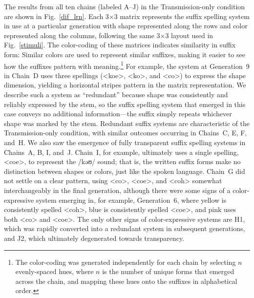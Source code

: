 \documentclass[doc,biblatex]{apa7}
\begin{document}
The results from all ten chains (labeled A--J) in the Transmission-only condition are shown in Fig.~\ref{dif_lrn}. Each 3×3 matrix represents the suffix spelling system in use at a particular generation with shape represented along the rows and color represented along the columns, following the same 3×3 layout used in Fig.~\ref{stimuli}. The color-coding of these matrices indicates similarity in suffix form: Similar colors are used to represent similar suffixes, making it easier to see how the suffixes pattern with meaning.\footnote{The color-coding was generated independently for each chain by selecting $n$ evenly-spaced hues, where $n$ is the number of unique forms that emerged across the chain, and mapping these hues onto the suffixes in alphabetical order.} For example, the system at Generation~9 in Chain~D uses three spellings (<koe>, <ko>, and <co>) to express the shape dimension, yielding a horizontal stripes pattern in the matrix representation. We describe such a system as ``redundant'' because shape was consistently and reliably expressed by the stem, so the suffix spelling system that emerged in this case conveys no additional information---the suffix simply repeats whichever shape was marked by the stem. Redundant suffix systems are characteristic of the Transmission-only condition, with similar outcomes occurring in Chains~C, E, F, and~H. We also saw the emergence of fully transparent suffix spelling systems in Chains~A, B, I, and~J. Chain~I, for example, ultimately uses a single spelling, <coe>, to represent the /kəʊ/ sound; that is, the written suffix forms make no distinction between shapes or colors, just like the spoken language. Chain~G did not settle on a clear pattern, using <co>, <coe>, and <coh> somewhat interchangeably in the final generation, although there were some signs of a color-expressive system emerging in, for example, Generation~6, where yellow is consistently spelled <coh>, blue is consistently spelled <coe>, and pink uses both <co> and <coe>. The only other signs of color-expressive systems are H1, which was rapidly converted into a redundant system in subsequent generations, and J2, which ultimately degenerated towards transparency.
\end{document}
